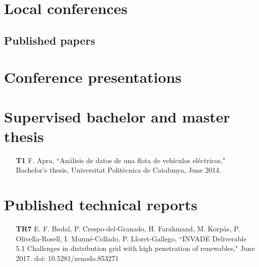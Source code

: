 \section*{Local conferences}

\subsection*{Published papers}



\section*{Conference presentations}



\section*{Supervised bachelor and master thesis}

\begin{itemize}
	\item [\textbf{T1}] F. Apra, ``An\'{a}lisis de datos de una flota de veh\'{i}culos el\'{e}ctricos," Bachelor's thesis, Universitat Polit\`{e}cnica de Catalunya, June 2014.
	

\end{itemize}

\section*{Published technical reports}

\begin{itemize}
	\item[\textbf{TR7}] E. F. B\o{}dal, P. Crespo-del-Granado, H. Farahmand, M. Korp\aa{}s, P. Olivella-Rosell, I. Munn\'{e}-Collado, P. Lloret-Gallego, ``INVADE Deliverable 5.1 Challenges in distribution grid with high penetration of renewables," June 2017. doi: 10.5281/zenodo.853271
		

\end{itemize}
